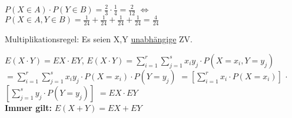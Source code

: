 $P(X\in A)\cdot P(Y\in B) = \frac{2}{3} \cdot \frac{1}{4} = \frac{2}{12}$ 
$\Leftrightarrow$
$P(X\in A, Y\in B) = \frac{1}{24} + \frac{1}{24} + \frac{1}{24} + \frac{1}{24} = \frac{4}{24} $

Multiplikationsregel: Es seien X,Y \underline{unabhängige} ZV.

$E(X\cdot Y) = EX\cdot EY$, 
$E(X\cdot Y) = \sum_{i=1}^{r} \sum_{j=1}^{s} x_i y_j \cdot P(X=x_i, Y=y_j)$ 
$=\sum_{i=1}^{r} \sum_{j=1}^{s} x_i y_j \cdot P(X=x_i) \cdot P(Y=y_j)$
$=[\sum_{i=1}^{r} x_i \cdot P(X=x_i)] $
$\cdot $
$[\sum_{j=1}^{s} y_j\cdot P(Y=y_j)]$
$= EX \cdot EY$\\

\textbf{Immer gilt:} $E(X+Y)= EX + EY$